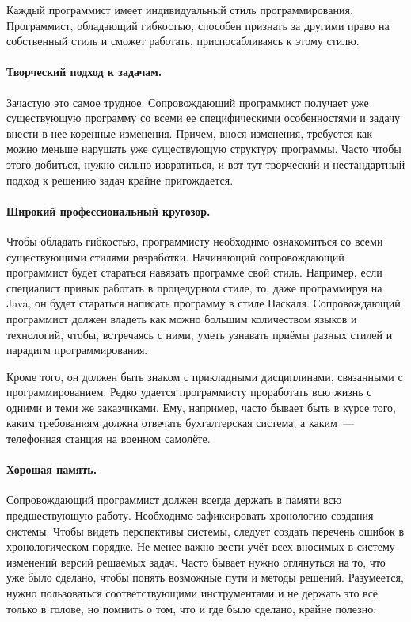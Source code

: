 \documentclass{../../text-style}
\begin{document}
Каждый программист имеет индивидуальный стиль программирования. Программист, обладающий гибкостью, способен признать за другими право на собственный стиль и сможет работать, приспосабливаясь к этому стилю.

\paragraph{Творческий подход к задачам.} Зачастую это самое трудное. Сопровождающий программист получает уже существующую программу со всеми ее специфическими особенностями и задачу внести в нее коренные изменения. Причем, внося изменения, требуется как можно меньше нарушать уже существующую структуру программы. Часто чтобы этого добиться, нужно сильно извратиться, и вот тут творческий и нестандартный подход к решению задач крайне пригождается.

\paragraph{Широкий профессиональный кругозор.} Чтобы обладать гибкостью, программисту необходимо ознакомиться со всеми существующими стилями разработки. Начинающий сопровождающий программист будет стараться навязать программе свой стиль. Например, если специалист привык работать в процедурном стиле, то, даже программируя на Java, он будет стараться написать программу в стиле Паскаля. Сопровождающий программист должен владеть как можно большим количеством языков и технологий, чтобы, встречаясь с ними, уметь узнавать приёмы разных стилей и парадигм программирования.

Кроме того, он должен быть знаком с прикладными дисциплинами, связанными с программированием. Редко удается программисту проработать всю жизнь с одними и теми же заказчиками. Ему, например, часто бывает быть в курсе того, каким требованиям должна отвечать бухгалтерская система, а каким~--- телефонная станция на военном самолёте.

\paragraph{Хорошая память.} Сопровождающий программист должен всегда держать в памяти всю предшествующую работу. Необходимо зафиксировать хронологию создания системы. Чтобы видеть перспективы системы, следует создать перечень ошибок в хронологическом порядке. Не менее важно вести учёт всех вносимых в систему изменений версий решаемых задач. Часто бывает нужно оглянуться на то, что уже было сделано, чтобы понять возможные пути и методы решений. Разумеется, нужно пользоваться соответствующими инструментами и не держать это всё только в голове, но помнить о том, что и где было сделано, крайне полезно.
\end{document}
